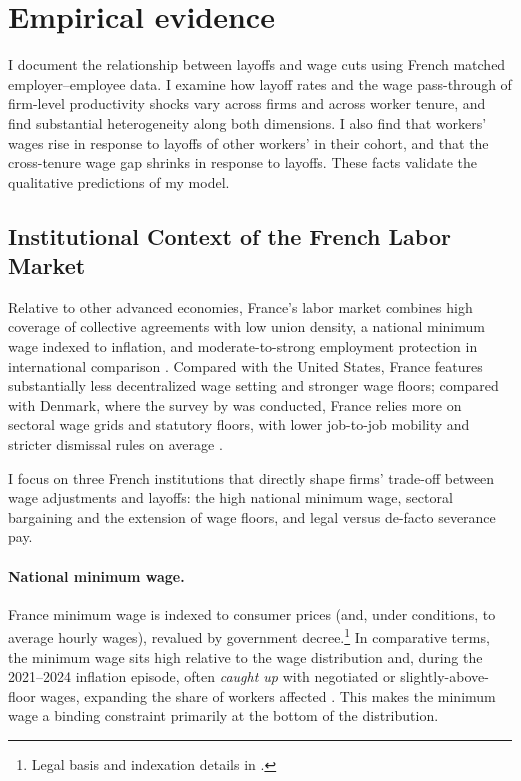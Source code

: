 \section{Empirical evidence}\label{sec:empirics}

I document the relationship between layoffs and wage cuts using French matched employer–employee data. I examine how layoff rates and the wage pass-through of firm-level productivity shocks vary across firms and across worker tenure, and find substantial heterogeneity along both dimensions. I also find that workers' wages rise in response to layoffs of other workers' in their cohort, and that the cross-tenure wage gap shrinks in response to layoffs. These facts validate the qualitative predictions of my model.

\subsection{Institutional Context of the French Labor Market}
\label{subsec:institutions-fr}

Relative to other advanced economies, France’s labor market combines high coverage of collective agreements with low union density, a national minimum wage indexed to inflation, and moderate-to-strong employment protection in international comparison \parencite{oecd_ictwss_france_2025,oecd_epl_db}. Compared with the United States, France features substantially less decentralized wage setting and stronger wage floors; compared with Denmark, where the survey by \textcite{bertheau2025} was conducted, France relies more on sectoral wage grids and statutory floors, with lower job-to-job mobility and stricter dismissal rules on average \parencite{oecd_eo_2025}. 

I focus on three French institutions that directly shape firms’ trade-off between wage adjustments and layoffs: the high national minimum wage, sectoral bargaining and the extension of wage floors, and legal versus de-facto severance pay.

\paragraph{National minimum wage.}
France minimum wage is indexed to consumer prices (and, under conditions, to average hourly wages), revalued by government decree.\footnote{Legal basis and indexation details in \textcite{eurofound_smic}.} In comparative terms, the minimum wage sits high relative to the wage distribution and, during the 2021–2024 inflation episode, often \emph{caught up} with negotiated or slightly-above-floor wages, expanding the share of workers affected \parencite{oecd_lowwage_fr_2025,fr_strategie_smic_2024}. This makes the minimum wage a binding constraint primarily at the bottom of the distribution.


